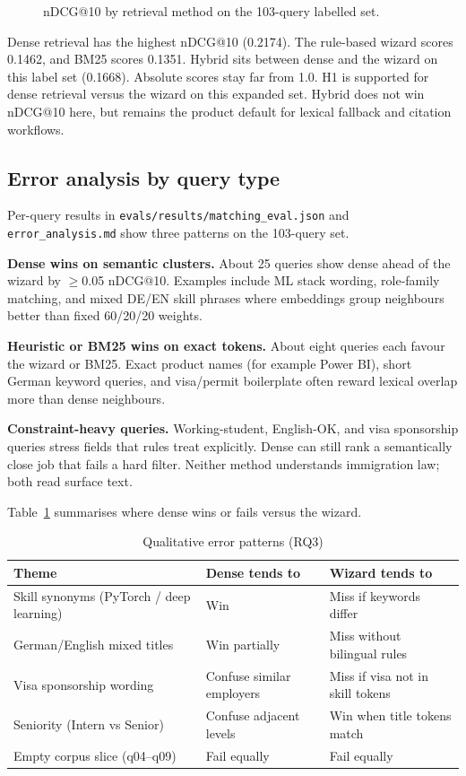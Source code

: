 \begin{figure}[ht]
\centering
{}
\caption{nDCG@10 by retrieval method on the 103-query labelled set.}
\label{fig:rq3-bars}
\end{figure}

Dense retrieval has the highest nDCG@10 (0.2174). The rule-based wizard scores 0.1462, and BM25 scores 0.1351. Hybrid sits between dense and the wizard on this label set (0.1668). Absolute scores stay far from 1.0. H1 is supported for dense retrieval versus the wizard on this expanded set. Hybrid does not win nDCG@10 here, but remains the product default for lexical fallback and citation workflows.

\subsection{Error analysis by query type}
\label{sec:error-analysis}

Per-query results in \texttt{evals/results/matching\_eval.json} and \texttt{error\_analysis.md} show three patterns on the 103-query set.

\textbf{Dense wins on semantic clusters.} About 25 queries show dense ahead of the wizard by $\geq$0.05 nDCG@10. Examples include ML stack wording, role-family matching, and mixed DE/EN skill phrases where embeddings group neighbours better than fixed 60/20/20 weights.

\textbf{Heuristic or BM25 wins on exact tokens.} About eight queries each favour the wizard or BM25. Exact product names (for example Power BI), short German keyword queries, and visa/permit boilerplate often reward lexical overlap more than dense neighbours.

\textbf{Constraint-heavy queries.} Working-student, English-OK, and visa sponsorship queries stress fields that rules treat explicitly. Dense can still rank a semantically close job that fails a hard filter. Neither method understands immigration law; both read surface text.

Table~\ref{tab:error-patterns} summarises where dense wins or fails versus the wizard.

\begin{table}[ht]
\centering
\caption{Qualitative error patterns (RQ3)}
\label{tab:error-patterns}
\begin{tabularx}{\textwidth}{@{}lXX@{}}
\toprule
\textbf{Theme} & \textbf{Dense tends to} & \textbf{Wizard tends to} \\
\midrule
Skill synonyms (PyTorch / deep learning) & Win & Miss if keywords differ \\
German/English mixed titles & Win partially & Miss without bilingual rules \\
Visa sponsorship wording & Confuse similar employers & Miss if visa not in skill tokens \\
Seniority (Intern vs Senior) & Confuse adjacent levels & Win when title tokens match \\
Empty corpus slice (q04--q09) & Fail equally & Fail equally \\
\bottomrule
\end{tabularx}
\end{table}

